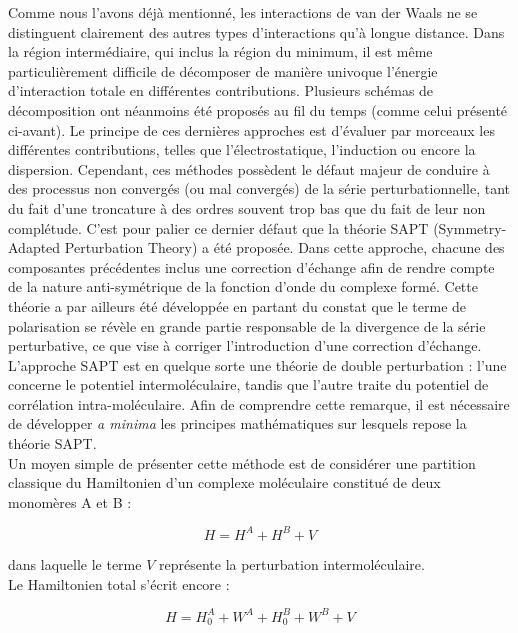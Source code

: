 \documentclass[12pt,a4paper]{book}
\begin{document}
	
	Comme nous l’avons déjà mentionné, les interactions de van der Waals ne se distinguent clairement des autres types d’interactions qu’à longue distance. Dans la région intermédiaire, qui inclus la région du minimum, il est même particulièrement difficile de décomposer de manière univoque l’énergie d'interaction totale en différentes contributions. Plusieurs schémas de décomposition ont néanmoins été proposés au fil du temps (comme celui présenté ci-avant). Le principe de ces dernières approches est d’évaluer par morceaux les différentes contributions, telles que l’électrostatique, l’induction ou encore la dispersion. Cependant, ces méthodes possèdent le défaut majeur de conduire à des processus non convergés (ou mal convergés) de la série perturbationnelle, tant du fait d'une troncature à des ordres souvent trop bas que du fait de leur non complétude. C’est pour palier ce dernier défaut que la théorie SAPT (Symmetry-Adapted Perturbation Theory) a été proposée. Dans cette approche, chacune des composantes précédentes inclus une correction d’échange afin de rendre compte de la nature anti-symétrique de la fonction d’onde du complexe formé. Cette théorie a par ailleurs été développée en partant du constat que le terme de polarisation se révèle en grande partie responsable de la divergence de la série perturbative, ce que vise à corriger l'introduction d'une correction d'échange. \\ 
		
	L’approche SAPT est en quelque sorte une théorie de double perturbation : l’une concerne le potentiel intermoléculaire, tandis que l’autre traite du potentiel de corrélation intra-moléculaire. Afin de comprendre cette remarque, il est nécessaire de développer \textit{a minima} les principes mathématiques sur lesquels repose la théorie SAPT.\\
	
	Un moyen simple de présenter cette méthode est de considérer une partition classique du Hamiltonien d'un complexe moléculaire constitué de deux monomères A et B :
	
	\begin{equation}
	H = H^{A} + H^{B} + V
	\end{equation}
	
	\noindent dans laquelle le terme $V$ représente la perturbation intermoléculaire.\\
	
	Le Hamiltonien total s'écrit encore :
	
	\begin{equation}
	H = H_{0}^{A} + W^{A} + H_{0}^{B} + W^{B} + V
	\end{equation}
	
\end{document}
